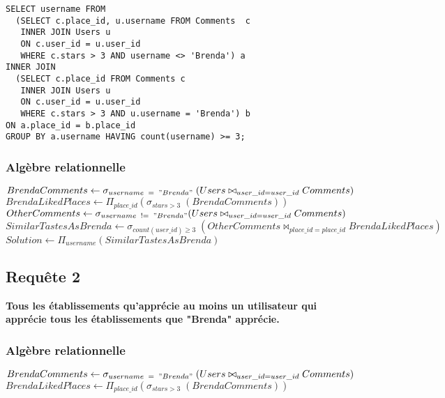 \documentclass[a4paper,10pt]{article}
\begin{document}
\begin{verbatim}
SELECT username FROM 
  (SELECT c.place_id, u.username FROM Comments  c 
   INNER JOIN Users u 
   ON c.user_id = u.user_id 
   WHERE c.stars > 3 AND username <> 'Brenda') a
INNER JOIN
  (SELECT c.place_id FROM Comments c 
   INNER JOIN Users u 
   ON c.user_id = u.user_id 
   WHERE c.stars > 3 AND u.username = 'Brenda') b
ON a.place_id = b.place_id
GROUP BY a.username HAVING count(username) >= 3;
\end{verbatim}

\subsubsection{Algèbre relationnelle}

$BrendaComments \leftarrow \sigma_{username\;\;=\;\;"Brenda"}\;(Users \bowtie_{user\_id=user\_id} Comments )$\\

$BrendaLikedPlaces \leftarrow \Pi_{place\_id} (\sigma_{stars>3}\;(BrendaComments))$ \\

$OtherComments \leftarrow \sigma_{username\;\; != \;\;"Brenda"} (Users \bowtie_{user\_id=user\_id} Comments )$\\

$SimilarTastesAsBrenda \leftarrow \sigma_{count(user\_id)\geq3}\; (OtherComments\bowtie_{place\_id=place\_id}BrendaLikedPlaces) $\\

$Solution \leftarrow \Pi_{username} (SimilarTastesAsBrenda) $

\newpage

\subsection{Requête 2}

\textbf{Tous les établissements qu’apprécie au moins un utilisateur qui apprécie tous les établissements que "Brenda" apprécie.}

\subsubsection{Algèbre relationnelle}

$BrendaComments \leftarrow \sigma_{username\;\;=\;\;"Brenda"}\;(Users \bowtie_{user\_id=user\_id} Comments )$\\

$BrendaLikedPlaces \leftarrow \Pi_{place\_id} (\sigma_{stars>3}\;(BrendaComments))$ \\
\end{document}

